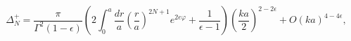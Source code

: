 \begin{equation}
\label{Eq_0313}
\Delta^{+}_N
  = \frac{\pi}{\Gamma^2(1-\epsilon)}
    \left( 2 \int^a_0 \frac{dr}{a} \left(\frac{r}{a}\right)^{2N+1}
    e^{2 e \varphi} + \frac{1}{\epsilon - 1}\right)
    \left(\frac{ka}{2}\right)^{2 - 2\epsilon}
    + O(ka)^{4-4\epsilon},
\end{equation}


